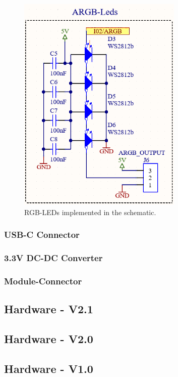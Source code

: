         \begin{figure}[H]
            \centering
            \includegraphics[width=0.7\textwidth]{assets/HW/RGB-LED-schematic.png}
            \caption{RGB-LEDs implemented in the schematic.}
        \end{figure}

    \subsubsection{USB-C Connector}

    \subsubsection{3.3V DC-DC Converter}

    \subsubsection{Module-Connector}

\subsection{Hardware - V2.1}

\subsection{Hardware - V2.0}

\subsection{Hardware - V1.0}
        